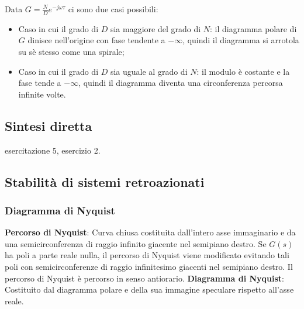 \begin{landscape}
\begin{multicols*}{3}
\begin{center}
        \end{center}
        Data $G = \frac{N}{D} e^{- j \omega \tau}$ ci sono due casi possibili:
        \begin{itemize}
            \item Caso in cui il grado di $D$ sia maggiore del grado di $N$: il diagramma polare di $G$ dinisce nell'origine con fase tendente a $- \infty$, quindi il diagramma si arrotola su sè stesso come una spirale;
            \item Caso in cui il grado di $D$ sia uguale al grado di $N$: il modulo è costante e la fase tende a $- \infty$, quindi il diagramma diventa una circonferenza percorsa infinite volte.
        \end{itemize}
    \subsection*{Sintesi diretta}
    esercitazione 5, esercizio 2.
    \subsection*{Stabilità di sistemi retroazionati}
    \subsubsection*{Diagramma di Nyquist}
    \textbf{Percorso di Nyquist}: Curva chiusa costituita dall'intero asse immaginario e da una semicirconferenza di raggio infinito giacente nel semipiano destro. Se $G(s)$ ha poli a parte reale nulla, il percorso di Nyquist viene modificato evitando tali poli con semicirconferenze di raggio infinitesimo giacenti nel semipiano destro. Il percorso di Nyquist è percorso in senso antiorario.\newline
    \newline
    \textbf{Diagramma di Nyquist}: Costituito dal diagramma polare e della sua immagine speculare rispetto all'asse reale.

\end{multicols*}
\end{landscape}

